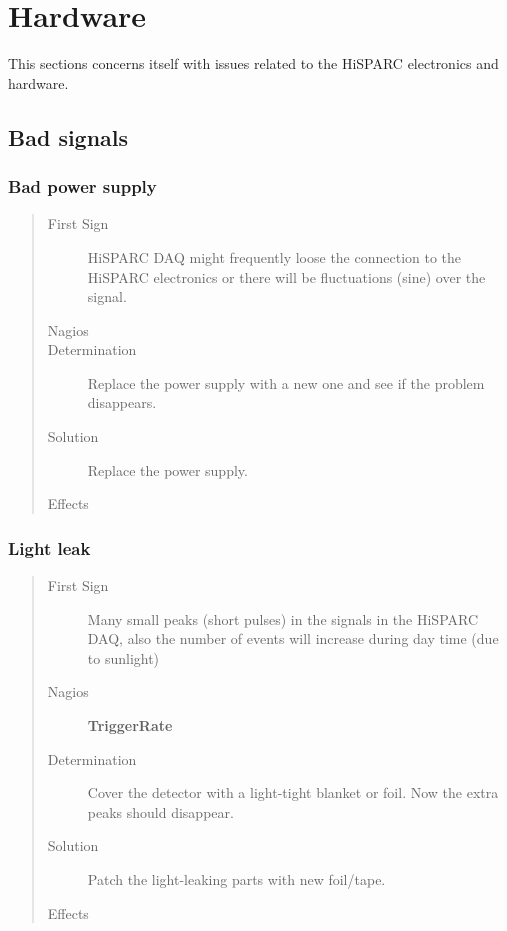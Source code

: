 \documentclass[a4paper,11pt,english]{sphinxmanual}
\begin{document}
\section{Hardware}
\label{known-issues:hardware}
This sections concerns itself with issues related to the HiSPARC
electronics and hardware.


\subsection{Bad signals}
\label{known-issues:bad-signals}

\subsubsection{Bad power supply}
\label{known-issues:bad-power-supply}\begin{quote}\begin{description}
\item[{First Sign}] \leavevmode
HiSPARC DAQ might frequently loose the connection to the
HiSPARC electronics or there will be fluctuations (sine)
over the signal.

\item[{Nagios}] \leavevmode
\item[{Determination}] \leavevmode
Replace the power supply with a new one and see if the
problem disappears.

\item[{Solution}] \leavevmode
Replace the power supply.

\item[{Effects}] \leavevmode
\end{description}\end{quote}


\subsubsection{Light leak}
\label{known-issues:light-leak}\begin{quote}\begin{description}
\item[{First Sign}] \leavevmode
Many small peaks (short pulses) in the signals in the
HiSPARC DAQ, also the number of events will increase
during day time (due to sunlight)

\item[{Nagios}] \leavevmode
\textbf{TriggerRate}

\item[{Determination}] \leavevmode
Cover the detector with a light-tight blanket or foil.
Now the extra peaks should disappear.

\item[{Solution}] \leavevmode
Patch the light-leaking parts with new foil/tape.

\item[{Effects}] \leavevmode
\end{description}\end{quote}
\end{document}
